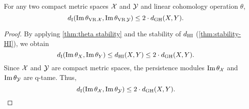 \subsubsection{}\label{cor:theta stability VR}
\corollary For any two compact metric spaces $\mathcal{X}$ and $\mathcal{Y}$ and linear cohomology operation $\theta$,
\[
d_{\mathrm{I}}(\operatorname{Im}\theta_{\operatorname{VR}\mathcal{X}}, \operatorname{Im}\theta_{\operatorname{VR}\mathcal{Y}}) \leq 2 \cdot d_{\mathrm{GH}}(X,Y).
\]

\begin{proof}
        By applying \cref{thm:theta stability} and the stability of $d_{\mathrm{HI}}$ (\cref{thm:stability-HI}), we obtain
        \[
        d_{\mathrm{I}}(\operatorname{Im}\theta_{X}, \operatorname{Im}\theta_{Y}) \leq
        d_{\mathrm{HI}}(X,Y) \leq 2\cdot d_{\mathrm{GH}}(X,Y).
        \]
        Since $\mathcal{X}$ and $\mathcal{Y}$ are compact metric spaces, the persistence modules $\operatorname{Im}\theta_{\mathcal{X}}$ and $\operatorname{Im}\theta_{\mathcal{Y}}$ are q-tame.
        Thus,
        \[
        d_{\mathrm{I}}(\operatorname{Im}\theta_{\mathcal{X}}, \operatorname{Im}\theta_{\mathcal{Y}}) \leq 2 \cdot d_{\mathrm{GH}}(X,Y). \qedhere
        \]
\end{proof}

